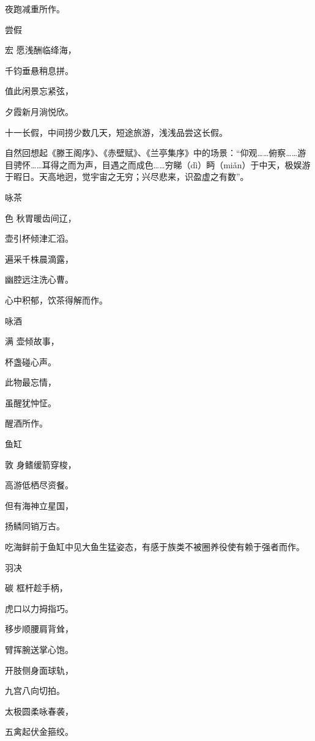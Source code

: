\documentclass{article}
\newenvironment{poem}[3]{
\begin{minipage}{\textwidth}
\begin{pinyinscope}\begin{center}\Large\linespread{1.4}\selectfont #2\end{center}\end{pinyinscope}
\begin{pinyinscope}
	\begin{center}
	\Large\linespread{1.4}\rmfamily\selectfont #3
}{\end{center}
\end{pinyinscope}
\end{minipage}
}
\begin{document}
夜跑减重所作。

\begin{poem}{}{尝假}
宏愿浅酬临绛海，

千钧垂悬稍息拼。

值此闲景忘紧弦，

夕霞新月淌悦欣。
\end{poem}

十一长假，中间捞少数几天，短途旅游，浅浅品尝这长假。

自然回想起《滕王阁序》、《赤壁赋》、《兰亭集序》中的场景：“仰观……俯察……游目骋怀……耳得之而为声，目遇之而成色……穷睇（dì）眄（miǎn）于中天，极娱游于暇日。天高地迥，觉宇宙之无穷；兴尽悲来，识盈虚之有数”。

\begin{poem}{}{咏茶}
色秋胃暖齿间辽，

壶引杯倾津汇滔。

遍采千株晨滴露，

幽腔远注洗心曹。
\end{poem}

心中积郁，饮茶得解而作。

\begin{poem}{}{咏酒}
满壶倾故事，

杯盏碰心声。

此物最忘情，

虽醒犹忡怔。
\end{poem}

醒酒所作。

\begin{poem}{}{鱼缸}
敦身鳍缓箭穿梭，

高游低栖尽资餐。

但有海神立星国，

扬鳞同销万古{}。
\end{poem}

吃海鲜前于鱼缸中见大鱼生猛姿态，有感于族类不被圈养役使有赖于强者而作。

\begin{poem}{}{羽决}
碳框{}杆趁手柄，

虎口以力拇指巧。

移步顺腰肩背耸，

臂挥腕送掌心饱。

开肢侧身面球轨，

九宫八向切拍{}。

太极圆柔咏春袭，

五禽起伏金箍绞。
\end{poem}
\end{document}
